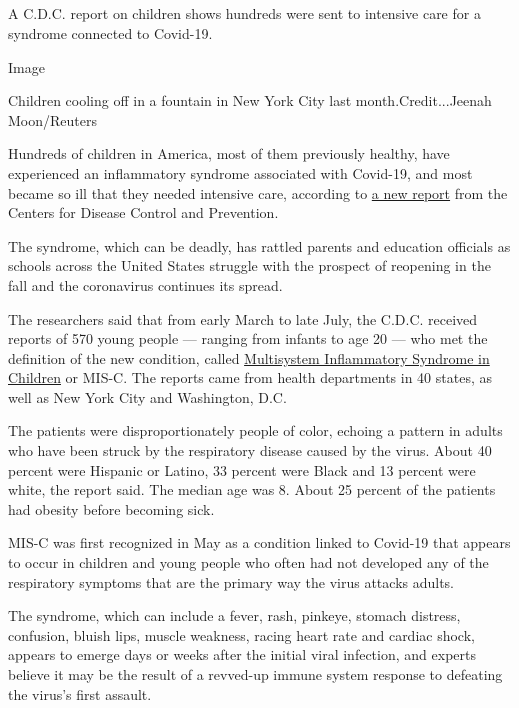 \hypertarget{section-6}{%
\subsection{}\label{section-6}}

A C.D.C. report on children shows hundreds were sent to intensive care
for a syndrome connected to Covid-19.

Image

Children cooling off in a fountain in New York City last
month.Credit...Jeenah Moon/Reuters

Hundreds of children in America, most of them previously healthy, have
experienced an inflammatory syndrome associated with Covid-19, and most
became so ill that they needed intensive care, according to
\href{https://www.cdc.gov/mmwr/volumes/69/wr/mm6932e2.htm?s_cid=mm6932e2_w\#T1_down}{a
new report} from the Centers for Disease Control and Prevention.

The syndrome, which can be deadly, has rattled parents and education
officials as schools across the United States struggle with the prospect
of reopening in the fall and the coronavirus continues its spread.

The researchers said that from early March to late July, the C.D.C.
received reports of 570 young people --- ranging from infants to age 20
--- who met the definition of the new condition, called
\href{https://www.nytimes.com/2020/05/17/health/coronavirus-multisystem-fnflammatory-syndrome-children-teenagers.html}{Multisystem
Inflammatory Syndrome in Children} or MIS-C. The reports came from
health departments in 40 states, as well as New York City and
Washington, D.C.

The patients were disproportionately people of color, echoing a pattern
in adults who have been struck by the respiratory disease caused by the
virus. About 40 percent were Hispanic or Latino, 33 percent were Black
and 13 percent were white, the report said. The median age was 8. About
25 percent of the patients had obesity before becoming sick.

MIS-C was first recognized in May as a condition linked to Covid-19 that
appears to occur in children and young people who often had not
developed any of the respiratory symptoms that are the primary way the
virus attacks adults.

The syndrome, which can include a fever, rash, pinkeye, stomach
distress, confusion, bluish lips, muscle weakness, racing heart rate and
cardiac shock, appears to emerge days or weeks after the initial viral
infection, and experts believe it may be the result of a revved-up
immune system response to defeating the virus's first assault.

